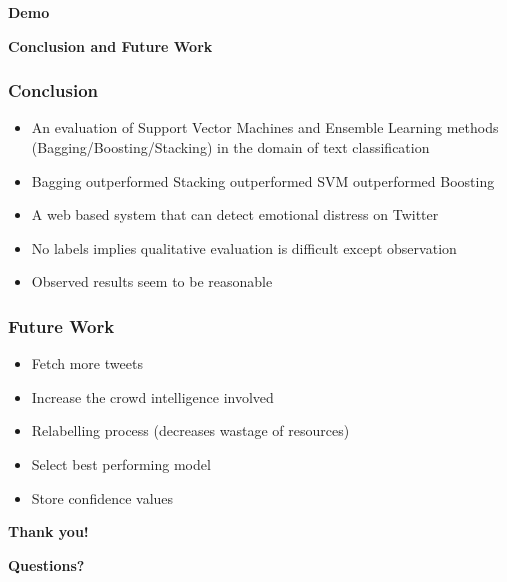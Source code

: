 \documentclass[xcolor=table]{beamer}
\begin{document}
    \begin{frame}
        \begin{center}
            \textbf{Demo}
        \end{center}
    \end{frame}
    
    \begin{frame}
        \begin{center}
            \textbf{Conclusion and Future Work}
        \end{center}
    \end{frame}
    
    \begin{frame}
        \frametitle{Conclusion}
        \begin{itemize}
            \item{An evaluation of Support Vector Machines and Ensemble Learning methods (Bagging/Boosting/Stacking) in the domain of text classification}
            \item{Bagging outperformed Stacking outperformed SVM outperformed Boosting}
            \pause
            \item{A web based system that can detect emotional distress on Twitter}
            \item{No labels implies qualitative evaluation is difficult except observation}
            \item{Observed results seem to be reasonable}
        \end{itemize}
    \end{frame}
    
    \begin{frame}
        \frametitle{Future Work}
        \begin{itemize}
            \item{Fetch more tweets}
            \item{Increase the crowd intelligence involved}
            \pause
            \item{Relabelling process (decreases wastage of resources)}
            \pause
            \item{Select best performing model}
            \item{Store confidence values}
        \end{itemize}
    \end{frame}
    
    \begin{frame}
        \begin{center}
            \textbf{Thank you!}
        \end{center}
        \begin{center}
            \textbf{Questions?}
        \end{center}
    \end{frame}
\end{document}
